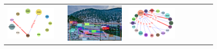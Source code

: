 \begin{figure}
\begin{tabular}{p{0.3cm}|rc|p{0.1cm}rc|p{0.1cm}rc}
		\includegraphics[width=\figwidthvis, align=c]{2337395_baseline_zs_graph_gt.png} & & \includegraphics[width=\figwidthvis, align=c]{2337395_baseline_zs_baseline.png} &
		\includegraphics[width=\figwidthvis, align=c]{2337395_baseline_zs_graph_baseline.png} & 

\end{tabular}
\end{figure}
